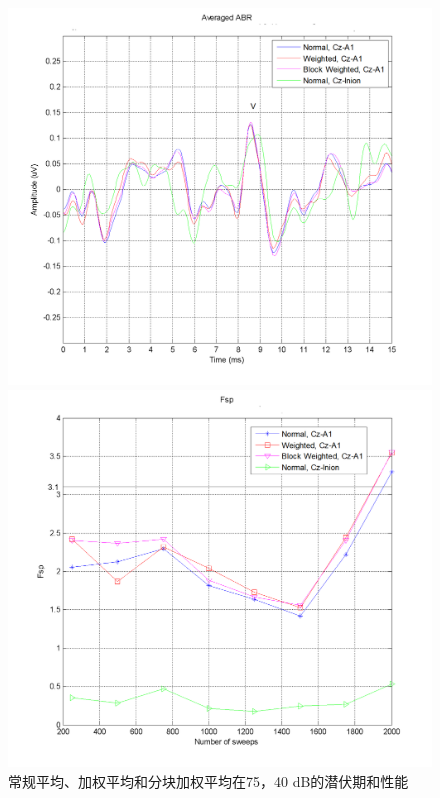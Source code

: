 \begin{figure}[H]
    \begin{minipage}{0.48\textwidth}
        \includegraphics[width=\textwidth]{images/click40dbABR.png}
    \end{minipage}
    \hfill
    \begin{minipage}{0.48\textwidth}
        \includegraphics[width=\textwidth]{images/click40dbABRfsp.png}
    \end{minipage}
    \caption{常规平均、加权平均和分块加权平均在75，40 dB的潜伏期和性能}
    \label{fig:7540ABRAndFsp}
\end{figure}

